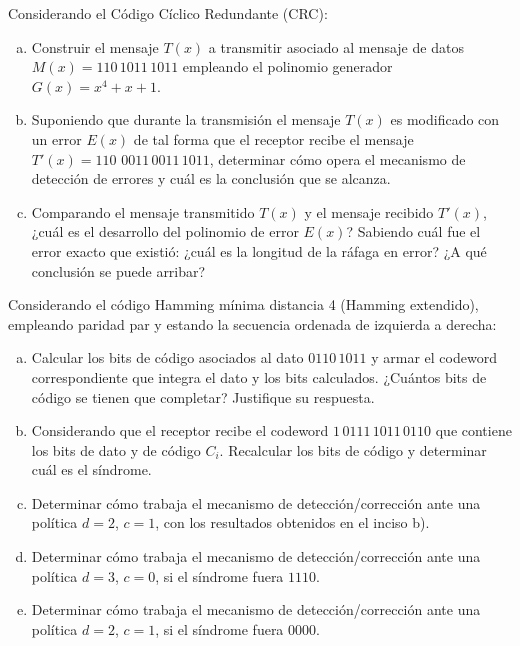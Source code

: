 \documentclass[12pt,a4paper]{article}
\begin{document}
 Considerando el Código Cíclico Redundante (CRC):
\begin{enumerate}[a)]
	\item Construir el mensaje $T(x)$ a transmitir asociado al mensaje de datos
	$M(x) = 110\,1011\,1011$ empleando el polinomio generador $G(x) = x^4 + x + 1$.

	\item Suponiendo que durante la transmisión el mensaje $T(x)$ es modificado con un error $E(x)$ de tal forma que el receptor recibe el mensaje $T'(x) = 110\,\, 0011\,0011\,1011$, determinar cómo opera el mecanismo de detección de errores y cuál es la conclusión que se alcanza.

	\item Comparando el mensaje transmitido $T(x)$ y el mensaje recibido $T'(x)$, ¿cuál es el desarrollo del polinomio de error $E(x)$? Sabiendo cuál fue el error exacto que existió: ¿cuál es la longitud de la ráfaga en error? ¿A qué conclusión se puede arribar?
\end{enumerate}

 Considerando el código Hamming mínima distancia 4 (Hamming extendido), empleando paridad par y estando la secuencia ordenada de izquierda a derecha:
\begin{enumerate}[a)]

	\item Calcular los bits de código asociados al dato $0110\,1011$ y armar el codeword correspondiente que integra el dato y los bits calculados. ¿Cuántos bits de código se tienen que completar? Justifique su respuesta. 

	\item Considerando que el receptor recibe el codeword $1\,0111\,1011\,0110$ que contiene los bits de dato y de código $C_i$. Recalcular los bits de código y determinar cuál es el síndrome.

	\item Determinar cómo trabaja el mecanismo de detección/corrección ante una política $d=2$, $c=1$, con los resultados obtenidos en el inciso b).

	\item Determinar cómo trabaja el mecanismo de detección/corrección ante una política $d=3$, $c=0$, si el síndrome fuera $1110$.

	\item Determinar cómo trabaja el mecanismo de detección/corrección ante una política $d=2$, $c=1$, si el síndrome fuera $0000$.

\end{enumerate}
\end{document}
